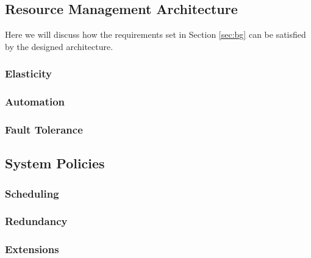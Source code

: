 \documentclass{acm_proc_article-sp}
\begin{document}
\subsection{Resource Management Architecture}
\label{sec:resource_man}
Here we will discuss how the requirements set in Section \ref{sec:bg} can be satisfied by the designed architecture.

\subsubsection{Elasticity}

\subsubsection{Automation}

\subsubsection{Fault Tolerance}

\subsection{System Policies}
\label{sec:policies}

\subsubsection{Scheduling}

\subsubsection{Redundancy}

\subsubsection{Extensions}

\end{document}

